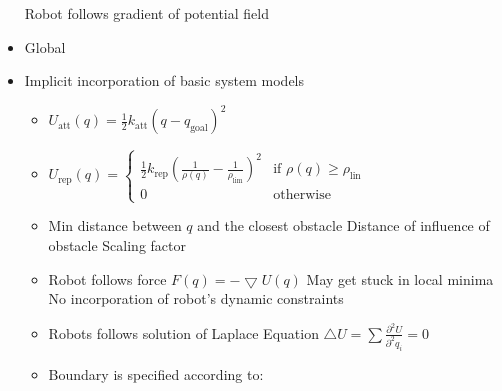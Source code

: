 \begin{itemize}
     Robot follows gradient of potential field
    \item Global
    \item Implicit incorporation of basic system models
        \begin{itemize}
             $U(q) = \underbrace{U_{\text{att}}(q)}_{\text{attractive}} + \underbrace{U_{\text{rep}}(q)}_{\text{repulsive}}$
            \item $U_{\text{att}}(q) = \frac{1}{2} k_{\text{att}} (q - q_{\text{goal}})^2$
            \item $U_{\text{rep}}(q) =
\begin{cases}
    \frac{1}{2} k_{\text{rep}}(\frac{1}{\rho(q)} - \frac{1}{\rho_{\text{lim}}})^2 & \text{if } \rho(q) \ge \rho_{\text{lin}}\\
    0 & \text{otherwise}
\end{cases}$
            \item
                \begin{itemize*}
                     Min distance between $q$ and the closest obstacle
                     Distance of influence of obstacle
                     Scaling factor
                \end{itemize*}
            \item Robot follows force $F(q) = -\bigtriangledown U(q)$
            \icon May get stuck in local minima
            \icon No incorporation of robot's dynamic constraints
        \end{itemize}
        \begin{itemize}
            \item Robots follows solution of Laplace Equation $\triangle U = \sum \frac{\partial^2 U}{\partial^2 q_i} = 0$
            \item Boundary is specified according to:
                \begin{itemize}
\end{itemize}
\end{itemize}
\end{itemize}
